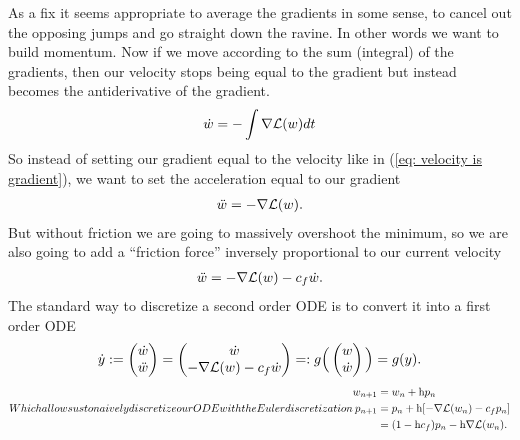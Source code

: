 As a fix it seems appropriate to average the gradients in some sense, to
cancel out the opposing jumps and go straight down the ravine. In other words
we want to build momentum. Now if we move according to the sum (integral) of
the gradients, then our velocity stops being equal to the gradient but instead
becomes the antiderivative of the gradient.
\begin{align*}
	\dot{w} = -\int\nabla\mathcal{L}(w)dt
\end{align*}
So instead of setting our gradient equal to the velocity like in (\ref{eq:
velocity is gradient}), we want to set the acceleration equal to our gradient
%
\begin{align*}
	\ddot{w} = -\nabla \mathcal{L}(w).
\end{align*}
%
But without friction we are going to massively overshoot the minimum, so we are
also going to add a ``friction force'' inversely proportional to our current
velocity
%
\begin{align}\label{eq: acceleration is gradient + friction}
	\ddot{w} = -\nabla \mathcal{L}(w) - c_f \dot{w}.
\end{align}
%
The standard way to discretize a second order ODE is to convert it into a first
order ODE
%
\begin{align*}
	\dot{y} := \begin{pmatrix}
		\dot{w}\\
		\ddot{w}
	\end{pmatrix}
	= \begin{pmatrix}
		\dot{w} \\
		-\nabla \mathcal{L}(w) - c_f \dot{w}
	\end{pmatrix}
	=: g\Big(\begin{pmatrix}
		w \\
		\dot{w}
	\end{pmatrix}\Big)
	= g(y).
\end{align*}
%
\begin{subequations}
Which allows us to naively discretize our ODE with the Euler discretization
\begin{align}
	\weights_{n+1} &= \weights_n + \lr \momentum_n \label{eq: naive momentum move}\\
	\momentum_{n+1} &= \momentum_n + \lr [-\nabla \Loss(\weights_n) - \friction \momentum_n]
	\label{eq: naive momentum}\\ \nonumber
	&= (1-\lr\friction)\momentum_n - \lr\nabla \Loss(\weights_n).
\end{align}
\end{subequations}
